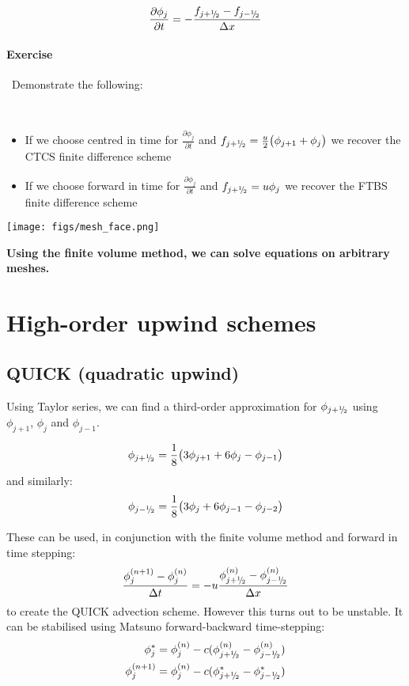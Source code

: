 \begin{minipage}{0.49\linewidth}\raggedright
\begin{equation*}
\frac{\partial \phi_j}{\partial t} = -\frac{f_{j+{^1\negthickspace/\negthinspace_2}}-f_{j-{^1\negthickspace/\negthinspace_2}}}{\Delta x}
\end{equation*}

\paragraph*{Exercise} ~Demonstrate the following:

\ \\
\begin{itemize}
\item If we choose centred in time for $\frac{\partial \phi_j}{\partial t}$ and $f_{j+{^1\negthickspace/\negthinspace_2}}=\frac{u}{2}\bigl(\phi_{j+1}+\phi_j\bigr)$ we recover the CTCS finite difference scheme
\item If we choose forward in time for $\frac{\partial \phi_j}{\partial t}$ and $f_{j+{^1\negthickspace/\negthinspace_2}}=u\phi_j$ we recover the FTBS finite difference scheme
\end{itemize}
\end{minipage}
%
\begin{minipage}{0.49\linewidth}
\texttt{[image: figs/mesh\_face.png]}
\end{minipage}

{\bf 
Using the finite volume method, we can solve equations on arbitrary meshes.
}
\clearpage
\section{High-order upwind schemes}
\subsection{QUICK (quadratic upwind)}

Using Taylor series, we can find a third-order approximation for $\phi_{j+{^1\negthickspace/\negthinspace_2}}$ using $\phi_{j+1}$, $\phi_{j}$ and $\phi_{j-1}$.

\[
\phi_{j+{^1\negthickspace/\negthinspace_2}} = \frac{1}{8}\bigl(3\phi_{j+1} + 6\phi_j - \phi_{j-1}\bigr)
\]
and similarly:
\[
\phi_{j-{^1\negthickspace/\negthinspace_2}} = \frac{1}{8}\bigl(3\phi_{j} + 6\phi_{j-1} - \phi_{j-2}\bigr)
\]


These can be used, in conjunction with the finite volume method and forward in time stepping:
\begin{equation*}
\frac{\phi_j^{(n+1)} - \phi_j^{(n)}}{\Delta t} = -u\frac{\phi_{j+{^1\negthickspace/\negthinspace_2}}^{(n)}-\phi_{j-{^1\negthickspace/\negthinspace_2}}^{(n)}}{\Delta x}
\end{equation*}
to create the QUICK advection scheme. However this turns out to be unstable. It can be stabilised using Matsuno forward-backward time-stepping:
\begin{align*}
\phi_j^* &= \phi_j^{(n)} - c(\phi_{j+\half}^{(n)}-\phi_{j-\half}^{(n)})\\
\phi_j^{(n+1)} &= \phi_j^{(n)} - c(\phi_{j+\half}^*-\phi_{j-\half}^*)
\end{align*}

